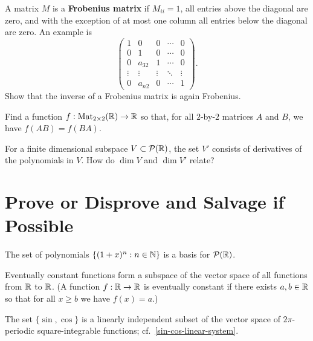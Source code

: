 \documentclass{homework}
\begin{document}
\begin{problem}\label{frobenius-matrix}A matrix $M$ is a \textbf{Frobenius matrix} if $M_{ii} = 1$, all
  entries above the diagonal are zero, and with the exception of at
  most one column all entries below the diagonal are zero.  An example is
  \[\begin{pmatrix}
      1&0&0&\cdots &0\\
      0&1&0&\cdots &0\\
      0&a_{32}&1&\cdots &0\\
      \vdots &\vdots &\vdots &\ddots &\vdots \\
      0&a_{n2}&0&\cdots &1
    \end{pmatrix}.\]
  Show that the inverse of a Frobenius matrix is again Frobenius.
\end{problem}

\begin{problem}
  Find a function $f : \operatorname{Mat}_{2\times 2}(\mathbb{R}) \to \mathbb{R}$ so that, for all
  $2$-by-$2$ matrices $A$ and $B$, we have $f(AB) = f(BA)$.
\end{problem}

\begin{problem}
  For a finite dimensional subspace $V \subset \mathcal{P}(\mathbb{R})$, the
  set $V'$ consists of derivatives of the polynomials in $V$.  How do
  $\dim V$ and $\dim V'$ relate?
\end{problem}

\section{Prove or Disprove and Salvage if Possible}

\begin{problem}
  The set of polynomials $\{ (1+x)^n : n \in \mathbb{N} \}$ is a basis for
  $\mathcal{P}(\mathbb{R})$.
\end{problem}

\begin{problem}\label{eventually-constant}Eventually constant functions form a subspace of the vector space of
  all functions from $\mathbb{R}$ to $\mathbb{R}$.  (A function $f : \mathbb{R} \to \mathbb{R}$ is
  eventually constant if there exists $a,b \in \mathbb{R}$ so that for all
  $x \geq b$ we have $f(x) = a$.)
\end{problem}

\begin{problem}\label{sin-cos-indie}The set $\{ \sin, \cos \}$ is a linearly independent subset of the
  vector space of $2\pi$-periodic square-integrable functions;
  cf.~\ref{sin-cos-linear-system}.
\end{problem}
\end{document}
